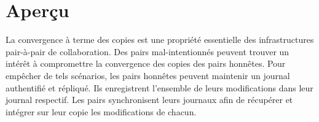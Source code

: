 %
%


\section{Aperçu}\label{sec:protocole-overview}

La convergence à terme des copies est une propriété essentielle des infrastructures pair-à-pair de collaboration.
Des pairs mal-intentionnés peuvent trouver un intérêt à compromettre la convergence des copies des pairs honnêtes.
Pour empêcher de tels scénarios, les pairs honnêtes peuvent maintenir un journal authentifié et répliqué.
Ils enregistrent l'ensemble de leurs modifications dans leur journal respectif.
Les pairs synchronisent leurs journaux afin de récupérer et intégrer sur leur copie les modifications de chacun.

